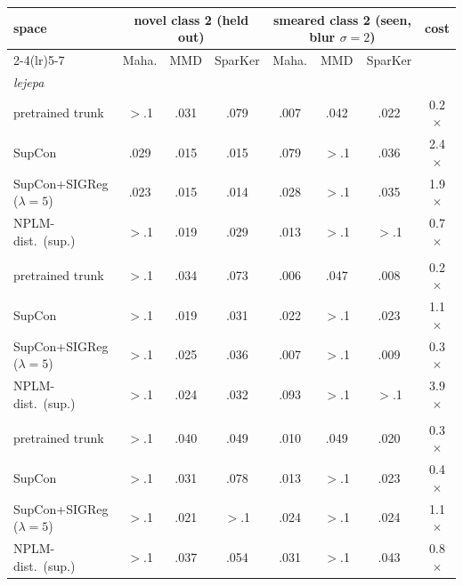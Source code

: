 \begin{table}[t]
\centering
\footnotesize
\begin{tabular}{lccccccc}
\toprule
space & \multicolumn{3}{c}{novel class 2 (held out)} & \multicolumn{3}{c}{smeared class 2 (seen, blur $\sigma{=}2$)} & cost \\
\cmidrule(lr){2-4}\cmidrule(lr){5-7}
& Maha. & MMD & SparKer & Maha. & MMD & SparKer & \\
\midrule
\multicolumn{8}{l}{\emph{lejepa}} \\
\quad pretrained trunk & $>$.1 & .031 & .079 & .007 & .042 & .022 & 0.2$\times$ \\
\quad SupCon & .029 & .015 & .015 & .079 & $>$.1 & .036 & 2.4$\times$ \\
\quad SupCon+SIGReg ($\lambda{=}5$) & .023 & .015 & .014 & .028 & $>$.1 & .035 & 1.9$\times$ \\
\quad NPLM-dist.\ (sup.) & $>$.1 & .019 & .029 & .013 & $>$.1 & $>$.1 & 0.7$\times$ \\
\addlinespace
\multicolumn{8}{l}{\emph{visreg}} \\
\quad pretrained trunk & $>$.1 & .034 & .073 & .006 & .047 & .008 & 0.2$\times$ \\
\quad SupCon & $>$.1 & .019 & .031 & .022 & $>$.1 & .023 & 1.1$\times$ \\
\quad SupCon+SIGReg ($\lambda{=}5$) & $>$.1 & .025 & .036 & .007 & $>$.1 & .009 & 0.3$\times$ \\
\quad NPLM-dist.\ (sup.) & $>$.1 & .024 & .032 & .093 & $>$.1 & $>$.1 & 3.9$\times$ \\
\addlinespace
\multicolumn{8}{l}{\emph{dino}} \\
\quad pretrained trunk & $>$.1 & .040 & .049 & .010 & .049 & .020 & 0.3$\times$ \\
\quad SupCon & $>$.1 & .031 & .078 & .013 & $>$.1 & .023 & 0.4$\times$ \\
\quad SupCon+SIGReg ($\lambda{=}5$) & $>$.1 & .021 & $>$.1 & .024 & $>$.1 & .024 & 1.1$\times$ \\
\quad NPLM-dist.\ (sup.) & $>$.1 & .037 & .054 & .031 & $>$.1 & .043 & 0.8$\times$ \\

\end{tabular}
\end{table}
